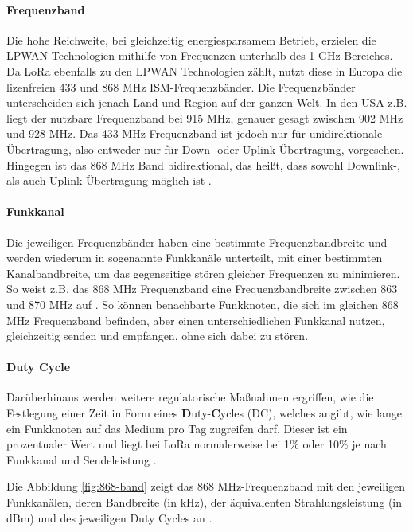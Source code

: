 \paragraph{Frequenzband}

Die hohe Reichweite, bei gleichzeitig energiesparsamem Betrieb, erzielen die LPWAN Technologien mithilfe von Frequenzen unterhalb des 1 GHz Bereiches. Da LoRa ebenfalls zu den LPWAN Technologien zählt, nutzt diese in Europa die lizenfreien 433 und 868 MHz ISM-Frequenzbänder. Die Frequenzbänder unterscheiden sich jenach Land und Region auf der ganzen Welt. In den USA z.B. liegt der nutzbare Frequenzband bei 915 MHz, genauer gesagt zwischen 902 MHz und 928 MHz. Das 433 MHz Frequenzband ist jedoch nur für unidirektionale Übertragung, also entweder nur für Down- oder Uplink-Übertragung, vorgesehen. Hingegen ist das 868 MHz Band bidirektional, das heißt, dass sowohl Downlink-, als auch Uplink-Übertragung möglich ist \cite{lpwan2022}. 

\paragraph{Funkkanal}

Die jeweiligen Frequenzbänder haben eine bestimmte Frequenzbandbreite und werden wiederum in sogenannte Funkkanäle unterteilt, mit einer bestimmten Kanalbandbreite, um das gegenseitige stören gleicher Frequenzen zu minimieren. So weist z.B. das 868 MHz Frequenzband eine Frequenzbandbreite zwischen 863 und 870 MHz auf \cite{Staniec2020}. So können benachbarte Funkknoten, die sich im gleichen 868 MHz Frequenzband befinden, aber einen unterschiedlichen Funkkanal nutzen, gleichzeitig senden und empfangen, ohne sich dabei zu stören. 

\paragraph{Duty Cycle}

Darüberhinaus werden weitere regulatorische Maßnahmen ergriffen, wie die Festlegung einer Zeit in Form eines \textbf{D}uty-\textbf{C}ycles (DC), welches angibt, wie lange ein Funkknoten auf das Medium pro Tag zugreifen darf. Dieser ist ein prozentualer Wert und liegt bei LoRa normalerweise bei 1\% oder 10\% je nach Funkkanal und Sendeleistung \cite{Staniec2020}. 

Die Abbildung \ref{fig:868-band} zeigt das 868 MHz-Frequenzband mit den jeweiligen Funkkanälen, deren Bandbreite (in kHz), der äquivalenten Strahlungsleistung (in dBm) und des jeweiligen Duty Cycles an . 

